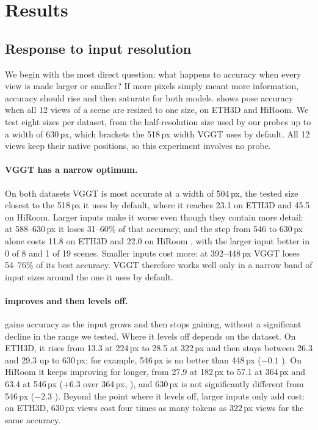 \section{Results}
\label{sec:results}

\subsection{Response to input resolution}
\label{sec:response}

We begin with the most direct question: what happens to accuracy when every view is made larger or smaller? If more pixels simply meant more information, accuracy should rise and then saturate for both models.  shows pose accuracy when all 12 views of a scene are resized to one size, on ETH3D and HiRoom. We test eight sizes per dataset, from the half-resolution size used by our probes up to a width of 630\,px, which brackets the 518\,px width VGGT uses by default. All 12 views keep their native positions, so this experiment involves no probe.

\paragraph{VGGT has a narrow optimum.}
On both datasets VGGT is most accurate at a width of 504\,px, the tested size closest to the 518\,px it uses by default, where it reaches 23.1 \auc on ETH3D and 45.5 on HiRoom. Larger inputs make it worse even though they contain more detail: at 588--630\,px it loses 31--60\% of that accuracy, and the step from 546 to 630\,px alone costs 11.8 \auc on ETH3D  and 22.0 on HiRoom , with the larger input better in 0 of 8 and 1 of 19 scenes. Smaller inputs cost more: at 392--448\,px VGGT loses 54--76\% of its best accuracy. VGGT therefore works well only in a narrow band of input sizes around the one it uses by default.

\paragraph{\pithree improves and then levels off.}
\pithree gains accuracy as the input grows and then stops gaining, without a significant decline in the range we tested. Where it levels off depends on the dataset. On ETH3D, it rises from 13.3 \auc at 224\,px to 28.5 at 322\,px and then stays between 26.3 and 29.3 up to 630\,px; for example, 546\,px is no better than 448\,px ($-0.1$ ). On HiRoom it keeps improving for longer, from 27.9 at 182\,px to 57.1 at 364\,px and 63.4 at 546\,px ($+6.3$ over 364\,px, ), and 630\,px is not significantly different from 546\,px ($-2.3$ ). Beyond the point where it levels off, larger inputs only add cost: on ETH3D, 630\,px views cost four times as many tokens as 322\,px views for the same accuracy.

